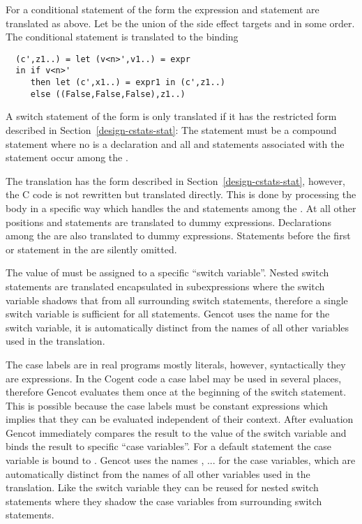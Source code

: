 For a conditional statement of the form  the expression  and statement  are translated as
above. Let  be the union of the side effect targets  and  in some order. The conditional
statement is translated to the binding
\begin{verbatim}
  (c',z1..) = let (v<n>',v1..) = expr
  in if v<n>' 
     then let (c',x1..) = expr1 in (c',z1..)
     else ((False,False,False),z1..)
\end{verbatim}

A switch statement of the form  is only translated if it has the restricted form described in 
Section~\ref{design-cstats-stat}: The statement  must be a compound statement  where no 
is a declaration and all  and  statements associated with the  statement occur among the 
. 

The translation has the form described in Section~\ref{design-cstats-stat}, however, the C code is not rewritten but translated
directly. This is done by processing the body  in a specific way which handles the  and 
statements among the . At all other positions  and  statements are translated to dummy expressions.
Declarations among the  are also translated to dummy expressions. Statements before the first  or 
statement in the  are silently omitted.

The value of  must be assigned to a specific ``switch variable''. Nested switch statements are translated encapsulated 
in subexpressions where the switch variable shadows that from all surrounding switch statements, therefore a single switch variable 
is sufficient for all statements. Gencot uses the name  for the switch variable, it is automatically distinct from the names of
all other variables used in the translation. 

The case labels are in real programs mostly literals, however, syntactically they are 
expressions. In the Cogent code a case label may be used in several places, therefore Gencot evaluates them once at the beginning 
of the switch statement. This is possible because the case labels must be constant 
expressions which implies that they can be evaluated independent of their context. After evaluation Gencot immediately compares the result
to the value of the switch variable and binds the result to specific ``case variables''. For a default statement the case variable is
bound to . Gencot uses the names , ... for the 
case variables, which are automatically distinct from the names of all other variables used in the translation. Like the switch variable
they can be reused for nested switch statements where they shadow the case variables from surrounding switch statements.

